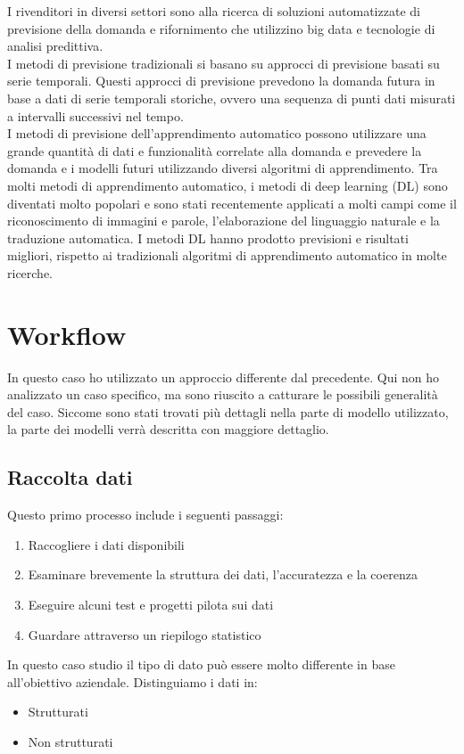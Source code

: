 \documentclass[12pt,a4paper]{report}
\begin{document}
I rivenditori in diversi settori sono alla ricerca di soluzioni automatizzate di previsione della domanda e rifornimento che utilizzino big data e tecnologie di analisi predittiva. \\
I metodi di previsione tradizionali si basano su approcci di previsione basati su serie temporali. Questi approcci di previsione prevedono la domanda futura in base a dati di serie temporali storiche, ovvero una sequenza di punti dati misurati a intervalli successivi nel tempo.\\
I metodi di previsione dell'apprendimento automatico possono utilizzare una grande quantità di dati e funzionalità correlate alla domanda e prevedere la domanda e i modelli futuri utilizzando diversi algoritmi di apprendimento. Tra molti metodi di apprendimento automatico, i metodi di deep learning (DL) sono diventati molto popolari e sono stati recentemente applicati a molti campi come il riconoscimento di immagini e parole, l'elaborazione del linguaggio naturale e la traduzione automatica.
I metodi DL hanno prodotto previsioni e risultati migliori, rispetto ai tradizionali algoritmi di apprendimento automatico in molte ricerche. 

\section{Workflow}
In questo caso ho utilizzato un approccio differente dal precedente. Qui non ho analizzato un caso specifico, ma sono riuscito a catturare le possibili generalità del caso. Siccome sono stati trovati più dettagli nella parte di modello utilizzato, la parte dei modelli verrà descritta con maggiore dettaglio.

\subsection{Raccolta dati}
Questo primo processo include i seguenti passaggi: \cite{mobidev:demandForecast}
\begin{enumerate}
    \item Raccogliere i dati disponibili
    \item Esaminare brevemente la struttura dei dati, l'accuratezza e la coerenza
    \item Eseguire alcuni test e progetti pilota sui dati
    \item Guardare attraverso un riepilogo statistico
\end{enumerate}

In questo caso studio il tipo di dato può essere molto differente in base all'obiettivo aziendale. Distinguiamo i dati in:
\begin{itemize}
    \item Strutturati
    \item Non strutturati
\end{itemize}
\end{document}
